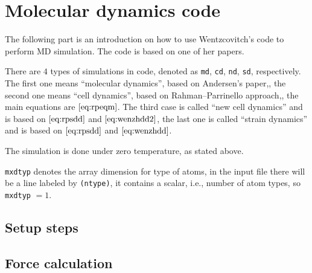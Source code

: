 
\section{Molecular dynamics code}

The following part is an introduction on how to use
Wentzcovitch's code to perform MD simulation. The code is
based on one of her papers.\cite{Wentzcovitch:1991ka}

There are $4$ types of simulations in code,
denoted as \texttt{md}, \texttt{cd}, \texttt{nd}, \texttt{sd},
respectively. The first one means ``molecular dynamics'',
based on Andersen's paper,\cite{Andersen:1980ew},
the second one means ``cell dynamics'', based on
Rahman–Parrinello approach,\cite{Parrinello:1980kx},
the main equations are $\eqref{eq:rpeqm}$.
The third case is called ``new cell dynamics'' and is based on
$\eqref{eq:rpsdd}$ and $\eqref{eq:wenzhdd2}$,
the last one is called ``strain dynamics'' and is based on
$\eqref{eq:rpsdd}$ and $\eqref{eq:wenzhdd}$.

The simulation is done under zero temperature, as stated above.

\texttt{mxdtyp} denotes the array dimension for type of atoms,
in the input file there will be a line labeled by \texttt{(ntype)}, it
contains a scalar, i.e., number of atom types, so \texttt{mxdtyp} $=1$.



\subsection{Setup steps}











\subsection{Force calculation}








